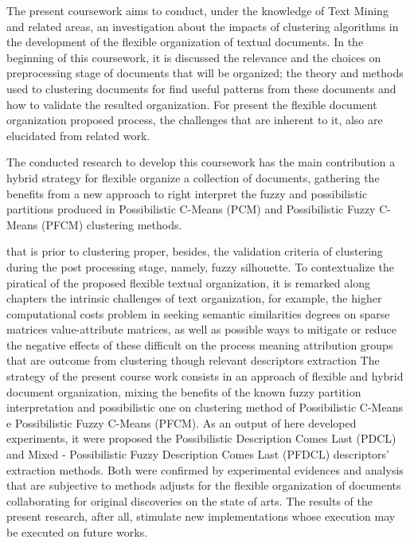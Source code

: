 The present coursework aims to conduct, under the knowledge of Text Mining and related areas, an
investigation about the impacts of clustering algorithms in the development of the flexible
organization of textual documents. In the beginning of this coursework, it is discussed the
relevance and the choices on  preprocessing stage of documents that will be organized; 
the theory and methods used to clustering documents for find useful patterns from these documents
and how to validate the resulted organization. For present the flexible document organization
proposed process, the challenges that are inherent to it, also are elucidated from related work. 

The conducted research to develop this coursework has the main contribution a hybrid  strategy for
flexible organize a collection of documents, gathering the benefits from a new approach to right
interpret the fuzzy and possibilistic partitions produced in Possibilistic C-Means (PCM) and
Possibilistic Fuzzy C-Means (PFCM) clustering methods.

that is prior to clustering proper, besides, the
validation criteria of clustering during the post processing stage, namely, fuzzy silhouette. To
contextualize the piratical of the proposed flexible textual organization, it is remarked along
chapters the intrinsic challenges of text organization, for example, the  higher computational costs
problem in seeking semantic similarities degrees on sparse matrices value-attribute matrices, as
well as possible ways to mitigate or reduce the negative effects of these difficult on the process
meaning attribution groups that are outcome from clustering though relevant descriptors extraction
The strategy of the present course work consists in an approach of flexible and hybrid document
organization, mixing the benefits of the known fuzzy partition interpretation and possibilistic one
on clustering method of Possibilistic C-Means e Possibilistic Fuzzy C-Means (PFCM). As an output of
here developed experiments, it were proposed the Possibilistic Description Comes Last (PDCL) and
Mixed - Possibilistic Fuzzy Description Comes Last (PFDCL) descriptors' extraction methods.
Both were confirmed by experimental evidences and analysis that are subjective to methods adjusts
for the flexible organization of documents collaborating for original discoveries on the state of
arts. The results of the present research, after all, stimulate new implementations whose execution
may be executed on future works.
